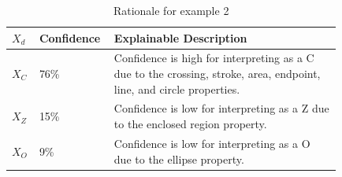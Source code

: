 \documentclass[conference]{IEEEtran}
\begin{document}
\begin{table}
    \caption{Prob. voting, effectiveness, and explainability for example 2}
    \centering
    \label{table:example2}
\end{table}

\begin{table}
    \caption{Rationale for example 2}
    \centering
    \begin{tabular}{| p{0.04\linewidth} | p{0.14\linewidth} | p{0.65\linewidth} |}
    \hline
     $X_d$ & Confidence & Explainable Description \\
    \hline \cline{1-3}
    $X_C$ & 76\% & Confidence is high for interpreting as a C due to the crossing, stroke, area, endpoint, line, and circle properties. \\ 
    \hline
    $X_Z$ & 15\% & Confidence is low for interpreting as a Z due to the enclosed region property. \\
    \hline
    $X_O$ & 9\% & Confidence is low for interpreting as a O due to the ellipse property. \\
    \hline
    \end{tabular}
    \label{table:exexample2}
\end{table}
\end{document}
